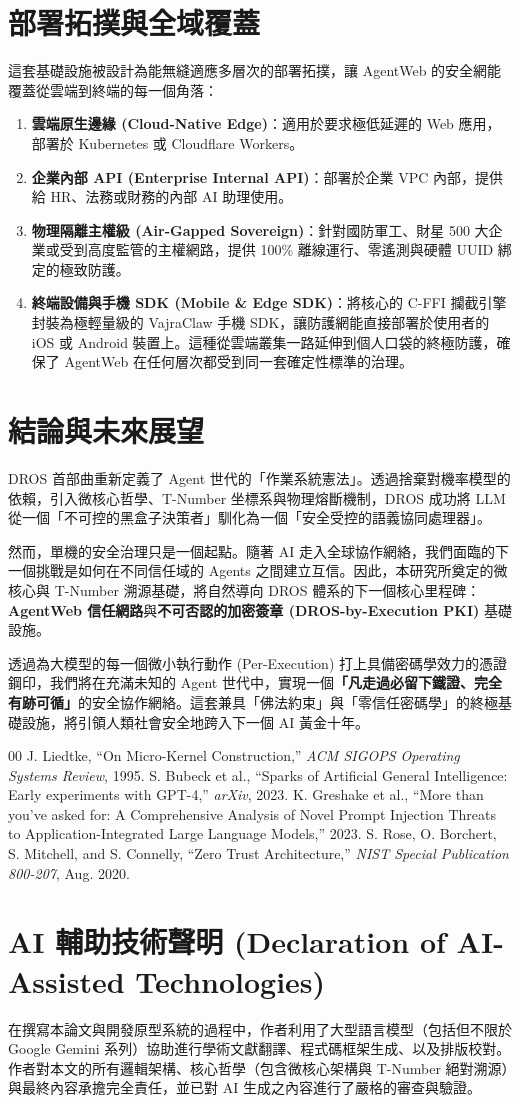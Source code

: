 \documentclass[conference]{IEEEtran}
\begin{document}
\section{部署拓撲與全域覆蓋}
這套基礎設施被設計為能無縫適應多層次的部署拓撲，讓 AgentWeb 的安全網能覆蓋從雲端到終端的每一個角落：
\begin{enumerate}
    \item \textbf{雲端原生邊緣 (Cloud-Native Edge)}：適用於要求極低延遲的 Web 應用，部署於 Kubernetes 或 Cloudflare Workers。
    \item \textbf{企業內部 API (Enterprise Internal API)}：部署於企業 VPC 內部，提供給 HR、法務或財務的內部 AI 助理使用。
    \item \textbf{物理隔離主權級 (Air-Gapped Sovereign)}：針對國防軍工、財星 500 大企業或受到高度監管的主權網路，提供 100\% 離線運行、零遙測與硬體 UUID 綁定的極致防護。
    \item \textbf{終端設備與手機 SDK (Mobile \& Edge SDK)}：將核心的 C-FFI 攔截引擎封裝為極輕量級的 VajraClaw 手機 SDK，讓防護網能直接部署於使用者的 iOS 或 Android 裝置上。這種從雲端叢集一路延伸到個人口袋的終極防護，確保了 AgentWeb 在任何層次都受到同一套確定性標準的治理。
\end{enumerate}

\section{結論與未來展望}
DROS 首部曲重新定義了 Agent 世代的「作業系統憲法」。透過捨棄對機率模型的依賴，引入微核心哲學、T-Number 坐標系與物理熔斷機制，DROS 成功將 LLM 從一個「不可控的黑盒子決策者」馴化為一個「安全受控的語義協同處理器」。

然而，單機的安全治理只是一個起點。隨著 AI 走入全球協作網絡，我們面臨的下一個挑戰是如何在不同信任域的 Agents 之間建立互信。因此，本研究所奠定的微核心與 T-Number 溯源基礎，將自然導向 DROS 體系的下一個核心里程碑：\textbf{AgentWeb 信任網路}與\textbf{不可否認的加密簽章 (DROS-by-Execution PKI)} 基礎設施。

透過為大模型的每一個微小執行動作 (Per-Execution) 打上具備密碼學效力的憑證鋼印，我們將在充滿未知的 Agent 世代中，實現一個\textbf{「凡走過必留下鐵證、完全有跡可循」}的安全協作網絡。這套兼具「佛法約束」與「零信任密碼學」的終極基礎設施，將引領人類社會安全地跨入下一個 AI 黃金十年。

\begin{thebibliography}{00}
 J. Liedtke, ``On Micro-Kernel Construction,'' \textit{ACM SIGOPS Operating Systems Review}, 1995.
 S. Bubeck et al., ``Sparks of Artificial General Intelligence: Early experiments with GPT-4,'' \textit{arXiv}, 2023.
 K. Greshake et al., ``More than you've asked for: A Comprehensive Analysis of Novel Prompt Injection Threats to Application-Integrated Large Language Models,'' 2023.
 S. Rose, O. Borchert, S. Mitchell, and S. Connelly, ``Zero Trust Architecture,'' \textit{NIST Special Publication 800-207}, Aug. 2020.
\end{thebibliography}

\section*{AI 輔助技術聲明 (Declaration of AI-Assisted Technologies)}
在撰寫本論文與開發原型系統的過程中，作者利用了大型語言模型（包括但不限於 Google Gemini 系列）協助進行學術文獻翻譯、程式碼框架生成、以及排版校對。作者對本文的所有邏輯架構、核心哲學（包含微核心架構與 T-Number 絕對溯源）與最終內容承擔完全責任，並已對 AI 生成之內容進行了嚴格的審查與驗證。
\end{document}

